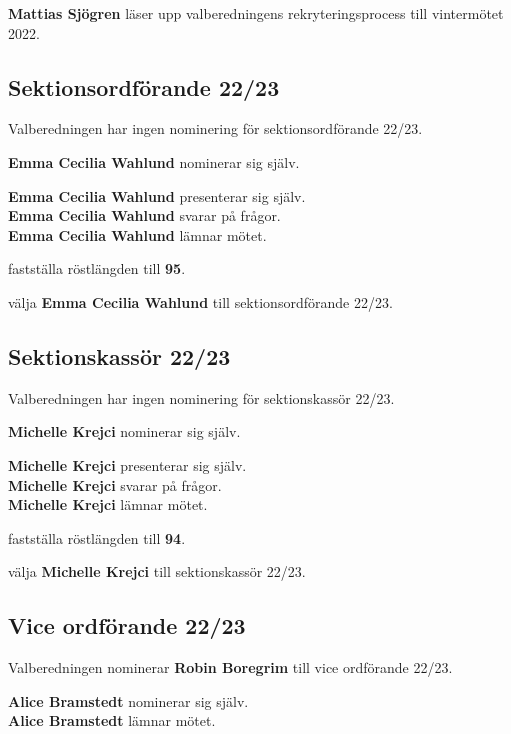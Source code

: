 \documentclass[../protokoll_vintermote_2022.tex]{subfiles}
\begin{document}
\textbf{Mattias Sjögren} läser upp valberedningens rekryteringsprocess till vintermötet 2022.






\subsection{Sektionsordförande 22/23}
Valberedningen har ingen nominering för sektionsordförande 22/23.

\textbf{Emma Cecilia Wahlund} nominerar sig själv.

\textbf{Emma Cecilia Wahlund} presenterar sig själv. \\
\textbf{Emma Cecilia Wahlund} svarar på frågor. \\
\textbf{Emma Cecilia Wahlund} lämnar mötet.

\motetbeslutar\att{} fastställa röstlängden till \textbf{95}.

\motetbeslutar\att{} välja \textbf{Emma Cecilia Wahlund} till sektionsordförande 22/23.







\subsection{Sektionskassör 22/23}
Valberedningen har ingen nominering för sektionskassör 22/23.

\textbf{Michelle Krejci} nominerar sig själv. 


\textbf{Michelle Krejci} presenterar sig själv. \\
\textbf{Michelle Krejci} svarar på frågor. \\
\textbf{Michelle Krejci} lämnar mötet.

\motetbeslutar\att{} fastställa röstlängden till \textbf{94}.

\motetbeslutar\att{} välja \textbf{Michelle Krejci} till sektionskassör 22/23.







\subsection{Vice ordförande 22/23}
Valberedningen nominerar \textbf{Robin Boregrim} till vice ordförande 22/23.

\textbf{Alice Bramstedt} nominerar sig själv. \\
\textbf{Alice Bramstedt} lämnar mötet.
\end{document}
